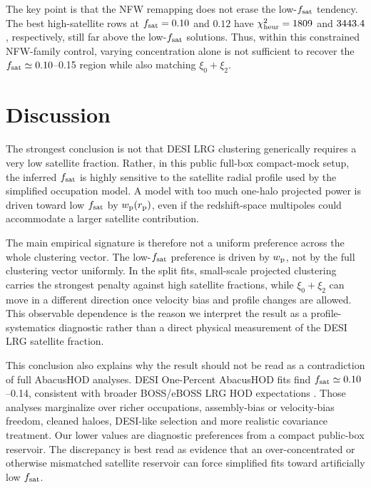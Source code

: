 \documentclass[fleqn,usenatbib]{mnras}
\newcommand{\fsat}{f_{\rm sat}}
\newcommand{\wproj}{w_{\rm p}}
\newcommand{\xizero}{\xi_0}
\newcommand{\xitwo}{\xi_2}
\begin{document}
The key point is that the NFW remapping does not erase the low-$\fsat$ tendency.  The best high-satellite rows at $\fsat=0.10$ and $0.12$ have $\chi^2_{\rm heur}=1809$ and $3443.4$, respectively, still far above the low-$\fsat$ solutions.  Thus, within this constrained NFW-family control, varying concentration alone is not sufficient to recover the $\fsat\simeq0.10$--0.15 region while also matching $\xizero+\xitwo$.

\section{Discussion}
\label{sec:discussion}

The strongest conclusion is not that DESI LRG clustering generically requires a very low satellite fraction.  Rather, in this public full-box compact-mock setup, the inferred $\fsat$ is highly sensitive to the satellite radial profile used by the simplified occupation model.  A model with too much one-halo projected power is driven toward low $\fsat$ by $\wproj(r_{\rm p})$, even if the redshift-space multipoles could accommodate a larger satellite contribution.

The main empirical signature is therefore not a uniform preference across the whole clustering vector.  The low-$\fsat$ preference is driven by $\wproj$, not by the full clustering vector uniformly.  In the split fits, small-scale projected clustering carries the strongest penalty against high satellite fractions, while $\xizero+\xitwo$ can move in a different direction once velocity bias and profile changes are allowed.  This observable dependence is the reason we interpret the result as a profile-systematics diagnostic rather than a direct physical measurement of the DESI LRG satellite fraction.

This conclusion also explains why the result should not be read as a contradiction of full AbacusHOD analyses.  DESI One-Percent AbacusHOD fits find $\fsat\simeq0.10$--0.14, consistent with broader BOSS/eBOSS LRG HOD expectations \citep{Yuan2022,Yuan2024,Zhai2017}.  Those analyses marginalize over richer occupations, assembly-bias or velocity-bias freedom, cleaned haloes, DESI-like selection and more realistic covariance treatment.  Our lower values are diagnostic preferences from a compact public-box reservoir.  The discrepancy is best read as evidence that an over-concentrated or otherwise mismatched satellite reservoir can force simplified fits toward artificially low $\fsat$.
\end{document}
